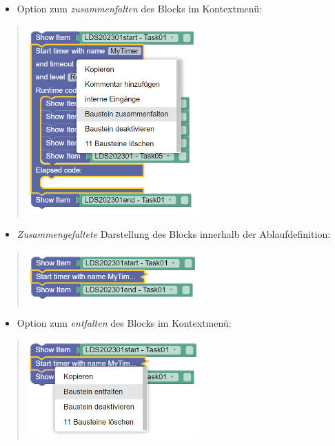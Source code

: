 \documentclass[
  letterpaper,
  DIV=11]{scrreprt}
\providecommand{\tightlist}{%
  \setlength{\itemsep}{0pt}\setlength{\parskip}{0pt}}\usepackage{longtable,booktabs,array}
\begin{document}
\begin{tcolorbox}
\begin{itemize}
\tightlist
\item
  Option zum \emph{zusammenfalten} des Blocks im Kontextmenü:
\end{itemize}

\begin{quote}
\includegraphics[width=2.60417in,height=\textheight]{img/screenshot-blockly-folding-unfolding-example-02-DEU.png}
\end{quote}

\begin{itemize}
\tightlist
\item
  \emph{Zusammengefaltete} Darstellung des Blocks innerhalb der
  Ablaufdefinition:
\end{itemize}

\begin{quote}
\includegraphics[width=2.60417in,height=\textheight]{img/screenshot-blockly-folding-unfolding-example-03-DEU.png}
\end{quote}

\begin{itemize}
\tightlist
\item
  Option zum \emph{entfalten} des Blocks im Kontextmenü:
\end{itemize}

\begin{quote}
\includegraphics[width=2.60417in,height=\textheight]{img/screenshot-blockly-folding-unfolding-example-04-DEU.png}
\end{quote}


\end{tcolorbox}
\end{document}

